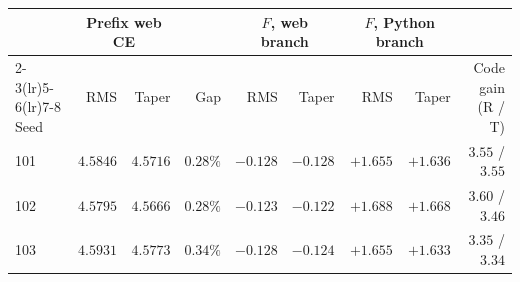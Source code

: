 \begin{tabular}{@{}lrrrrrrrr@{}}
\toprule
 & \multicolumn{2}{c}{Prefix web CE} & & \multicolumn{2}{c}{$F$, web branch} & \multicolumn{2}{c}{$F$, Python branch} & \\
\cmidrule(lr){2-3}\cmidrule(lr){5-6}\cmidrule(lr){7-8}
Seed & RMS & Taper & Gap & RMS & Taper & RMS & Taper & Code gain (R / T) \\
\midrule
101 & $4.5846$ & $4.5716$ & $0.28\%$ & $-0.128$ & $-0.128$ & ${+}1.655$ & ${+}1.636$ & $3.55$ / $3.55$ \\
102 & $4.5795$ & $4.5666$ & $0.28\%$ & $-0.123$ & $-0.122$ & ${+}1.688$ & ${+}1.668$ & $3.60$ / $3.46$ \\
103 & $4.5931$ & $4.5773$ & $0.34\%$ & $-0.128$ & $-0.124$ & ${+}1.655$ & ${+}1.633$ & $3.35$ / $3.34$ \\
\bottomrule
\end{tabular}

